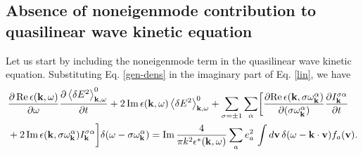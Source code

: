 \documentclass[12pt,a4paper,ruledheader]{report}
\begin{document}
\subsection{Absence of noneigenmode contribution to quasilinear wave
  kinetic equation}
Let us start by including the noneigenmode term in the quasilinear
wave kinetic equation. Substituting Eq. \eqref{gen-dens} in the
imaginary part of Eq. \eqref{lin}, we have
\begin{equation}
  \begin{split}
 &\frac{\partial\, \mbox{Re}\,\epsilon({\bf k},\omega)}{\partial \omega}
  \frac{\partial \left< \delta E^2 \right>_{{\bf k},\omega}^0}{\partial t}
  + 2\, \mbox{Im}\,\epsilon({\bf k},\omega)
  \left< \delta E^2 \right>_{{\bf k},\omega}^0+\sum_{\sigma=\pm 1}\sum_\alpha\biggl[
    \frac{\partial \mbox{Re}\, \epsilon({\bf k},\sigma\omega_{\bf k}^\alpha)}
    {\partial(\sigma\omega_{\bf k}^\alpha)}
    \frac{\partial I_{\bf k}^{\sigma \alpha}}{\partial t}\\
  &+2\,\mbox{Im}\,\epsilon({\bf k},\sigma\omega_{\bf k}^\alpha)
    I_{\bf k}^{\sigma \alpha}\biggr]\delta(\omega-\sigma\omega_{\bf k}^\alpha)
=\mbox{Im}\,\frac{4}{\pi k^2\epsilon^{*}({\bf k},\omega)}
  \sum_a e^2_a\, \int d{\bf v}\,\delta(\omega-{\bf k \cdot v})f_a({\bf v}).
\end{split}
\end{equation}
\end{document}
